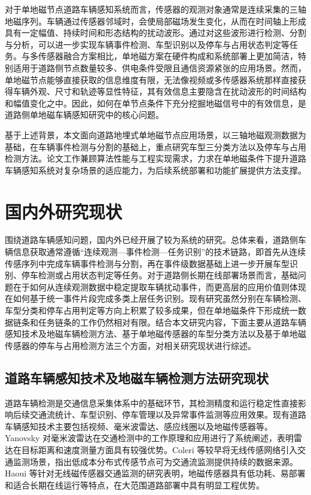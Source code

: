 \documentclass{xdupgthesis}
\begin{document}
对于单地磁节点道路车辆感知系统而言，传感器的观测对象通常是连续采集的三轴地磁序列。车辆通过传感器邻域时，会使局部磁场发生变化，从而在时间轴上形成具有一定幅值、持续时间和形态结构的扰动波形。通过对这些波形进行检测、分割与分析，可以进一步实现车辆事件检测、车型识别以及停车与占用状态判定等任务。与多传感器融合方案相比，单地磁方案在硬件构成和系统部署上更加简洁，特别适用于道路侧节点数量较多、供电条件受限且通信资源紧张的应用场景。然而，单地磁节点能够直接获取的信息维度有限，无法像视频或多传感器系统那样直接获得车辆外观、尺寸和轨迹等显性特征，其有效信息主要隐含在扰动波形的时间结构和幅值变化之中。因此，如何在单节点条件下充分挖掘地磁信号中的有效信息，是道路侧单地磁车辆感知研究中的核心问题。

基于上述背景，本文面向道路地埋式单地磁节点应用场景，以三轴地磁观测数据为基础，在车辆事件检测与分割的基础上，重点研究车型三分类方法以及停车与占用检测方法。论文工作兼顾算法性能与工程实现需求，力求在单地磁条件下提升道路车辆感知系统对复杂场景的适应能力，为后续系统部署和功能扩展提供方法支撑。


\section{国内外研究现状}
\label{sec:related_work}

围绕道路车辆感知问题，国内外已经开展了较为系统的研究。总体来看，道路侧车辆信息获取通常遵循“连续观测—事件检测—任务识别”的技术链路，即首先从连续传感序列中完成车辆事件检测与分割，再在事件级数据基础上进一步开展车型识别、停车检测或占用状态判定等任务。对于道路侧长期在线部署场景而言，基础问题在于如何从连续观测数据中稳定提取车辆扰动事件，而更高层的应用价值则体现在如何基于统一事件片段完成多类上层任务识别。现有研究虽然分别在车辆检测、车型分类和停车占用判定等方向上积累了较多成果，但在单地磁条件下形成统一数据链条和任务链条的工作仍然相对有限。结合本文研究内容，下面主要从道路车辆感知技术及地磁车辆检测方法、基于单地磁传感器的车型分类方法以及基于单地磁传感器的停车与占用检测方法三个方面，对相关研究现状进行综述。

\subsection{道路车辆感知技术及地磁车辆检测方法研究现状}
\label{sec:related_sensor_detection}

道路车辆检测是交通信息采集体系中的基础环节，其检测精度和运行稳定性直接影响后续交通流统计、车型识别、停车管理以及异常事件监测等应用效果。现有道路车辆感知技术主要包括视频、毫米波雷达、感应线圈以及地磁传感器等。Yanovsky 对毫米波雷达在交通检测中的工作原理和应用进行了系统阐述，表明雷达在目标距离和速度测量方面具有较强优势\cite{R07}。Coleri 等较早将无线传感网络引入交通监测场景，指出低成本分布式传感节点可为交通流监测提供持续的数据来源\cite{R08}。Haoui 等针对无线磁传感器交通监测的研究表明，地磁传感器具有低功耗、易部署和适合长期在线运行等特点，在大范围道路部署中具有明显工程优势\cite{R09}。
\end{document}
